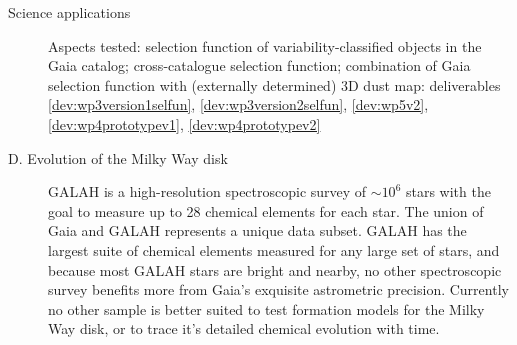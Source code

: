 \begin{workpackage}{Science applications}
\begin{wpobjectives}
\begin{description}
{ %
        
        
        \textsf{Aspects tested: selection function of variability-classified objects in the Gaia catalog; cross-catalogue selection function; combination of Gaia selection function with (externally determined) 3D dust map: deliverables \ref{dev:wp3version1selfun}, \ref{dev:wp3version2selfun}, \ref{dev:wp5v2}, \ref{dev:wp4prototypev1}, \ref{dev:wp4prototypev2}}
     }
     
     \item[D. Evolution of the Milky Way disk]
        {GALAH is a high-resolution spectroscopic survey of $\sim10^6$ stars with the goal to measure up to 28 chemical elements for each star. The union of Gaia and GALAH represents a unique data subset. GALAH has the largest suite of chemical elements measured for any large set of stars, and because most GALAH stars are bright and nearby, no other spectroscopic survey benefits more from Gaia's exquisite astrometric precision. Currently no other sample is better suited to test formation models for the Milky Way disk, or to trace it's detailed chemical evolution with time.
      
}
\end{description}
\end{wpobjectives}
\end{workpackage}
